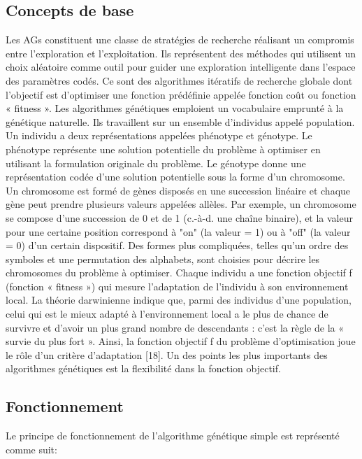 \documentclass[12pt,a4paper]{article}
\begin{document}
	\subsection{Concepts de base}
	Les AGs constituent une classe de stratégies de recherche réalisant un compromis entre l’exploration et l’exploitation. Ils représentent des méthodes qui utilisent
un choix aléatoire comme outil pour guider une exploration intelligente dans l’espace des paramètres codés. Ce sont des algorithmes itératifs de recherche globale dont l’objectif est d’optimiser une fonction prédéfinie appelée fonction coût ou fonction « fitness ».
	Les algorithmes génétiques emploient un vocabulaire emprunté à la génétique naturelle. Ils travaillent sur un ensemble d’individus appelé population. Un individu a deux représentations appelées phénotype et génotype. Le phénotype représente une solution potentielle du problème à optimiser en utilisant la formulation originale du problème. Le génotype donne une représentation codée
d’une solution potentielle sous la forme d’un chromosome. Un chromosome est formé de gènes disposés en une succession linéaire et chaque gène peut prendre plusieurs
valeurs appelées allèles. Par exemple, un chromosome se compose d’une succession de 0 et de 1 (c.-à-d. une chaîne binaire), et la valeur pour une certaine position correspond à "on" (la valeur = 1) ou à "off" (la valeur = 0) d’un certain dispositif. Des formes plus compliquées, telles qu’un ordre des symboles et une permutation des alphabets, sont choisies pour décrire les chromosomes du problème à optimiser. Chaque individu a une fonction objectif f (fonction « fitness ») qui mesure l’adaptation de l’individu à son environnement local. La théorie darwinienne indique que, parmi des individus d’une population, celui qui est le mieux adapté à l’environnement local a le plus de chance de survivre et d’avoir un plus grand nombre de descendants : c’est la règle de la « survie du plus fort ». Ainsi, la
fonction objectif f du problème d’optimisation joue le rôle d’un critère d’adaptation [18]. Un des points les plus importants des algorithmes génétiques est la flexibilité dans la fonction objectif.

	\subsection{Fonctionnement}
	
	Le principe de fonctionnement de l'algorithme génétique simple est représenté comme suit: \\
	 
\end{document}
